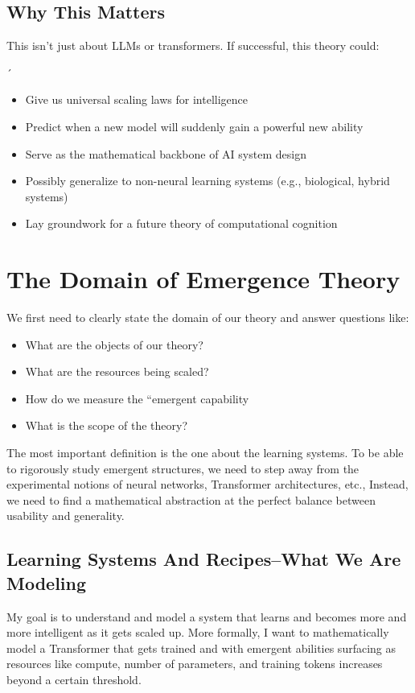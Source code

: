 \documentclass[12pt]{article}
\begin{document}
\subsection{Why This Matters}
This isn’t just about LLMs or transformers. If successful, this theory could:

´\begin{itemize}
    \item Give us universal scaling laws for intelligence
    \item Predict when a new model will suddenly gain a powerful new ability
    \item Serve as the mathematical backbone of AI system design
    \item Possibly generalize to non-neural learning systems (e.g., biological, hybrid systems)
    \item Lay groundwork for a future theory of computational cognition
\end{itemize}

\section{The Domain of Emergence Theory}

We first need to clearly state the domain of our theory and answer questions like:

\begin{itemize}
    \item What are the objects of our theory?
    \item What are the resources being scaled?
    \item How do we measure the “emergent capability
    \item What is the scope of the theory?
\end{itemize}

The most important definition is the one about the learning systems. To be able to rigorously study emergent structures, we need to step away from the experimental notions of neural networks, Transformer architectures, etc., Instead, we need to find a mathematical abstraction at the perfect balance between usability and generality.

\subsection{Learning Systems And Recipes--What We Are Modeling}

My goal is to understand and model a system that learns and becomes more and more intelligent as it gets scaled up. More formally, I want to mathematically model a Transformer that gets trained and with emergent abilities surfacing as resources like compute, number of parameters, and training tokens increases beyond a certain threshold. 
\end{document}
